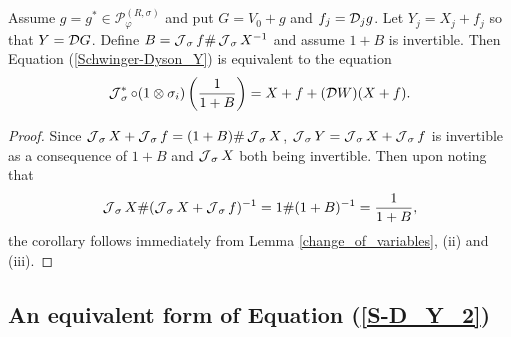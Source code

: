 \begin{cor}
Assume $g=g^*\in\mathscr{P}^{(R,\sigma)}_{\varphi}$ and put $G=V_0+g$ and $f_j=\mathcal D_j g$. Let $Y_j=X_j+f_j$ so that $Y=\mathcal D G$. Define $B=\operatorname{\mathcal J}_\sigma f\# \operatorname{\mathcal J}_\sigma X^{-1}$ and assume $1+B$ is invertible. Then Equation (\ref{Schwinger-Dyson_Y}) is equivalent to the equation
	\begin{equation}\label{S-D_Y_2}
		\operatorname{\mathcal J}_\sigma^*\circ(1\otimes\sigma_i)\left( \frac{1}{1+B}\right) = X+f+(\mathcal D W)(X+f).
	\end{equation}
\end{cor}
\begin{proof}
Since $\operatorname{\mathcal J}_\sigma X+ \operatorname{\mathcal J}_\sigma f=(1+B)\#\operatorname{\mathcal J}_\sigma X$, $\operatorname{\mathcal J}_\sigma Y=\operatorname{\mathcal J}_\sigma X+\operatorname{\mathcal J}_\sigma f$ is invertible as a consequence of $1+B$ and $\operatorname{\mathcal J}_\sigma X$ both being invertible. Then upon noting that
	\begin{equation*}
		\operatorname{\mathcal J}_\sigma X\# (\operatorname{\mathcal J}_\sigma X+ \operatorname{\mathcal J}_\sigma f)^{-1}= 1\# (1+B)^{-1}=\frac{1}{1+B},
	\end{equation*}
the corollary follows immediately from Lemma \ref{change_of_variables}, (ii) and (iii).
\end{proof}



\subsection{An equivalent form of Equation (\ref{S-D_Y_2})}\label{equivalent_S-D}

